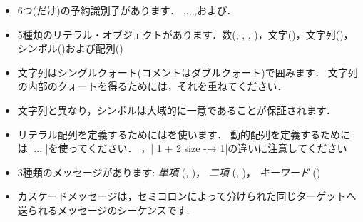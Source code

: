 \documentclass[a4paper,10pt,twoside]{book}
\begin{document}
\begin{itemize}
\item {}6つ(だけ)の予約識別子があります．
,,,,,および．

\item		5種類のリテラル・オブジェクトがあります．数(, , , )，文字()，文字列()，シンボル()および配列()

\item		文字列はシングルクォート(コメントはダブルクォート)で囲みます．
		文字列の内部のクォートを得るためには，それを重ねてください．

\item		文字列と異なり，シンボルは大域的に一意であることが保証されます．

\item		リテラル配列を定義するためにはを使います．
		動的配列を定義するためには\ct|{ ... }|を使ってください．
		，\ct|{ 1 + 2 } size -→ 1|の違いに注意してください

\item		3種類のメッセージがあります:
		\emph{単項} (\eg {}, )，
		\emph{二項} (\eg {}, )，
		\emph{キーワード} (\eg {})

\item		カスケードメッセージは，セミコロンによって分けられた同じターゲットへ送られるメッセージのシーケンスです.


\end{itemize}
\end{document}
